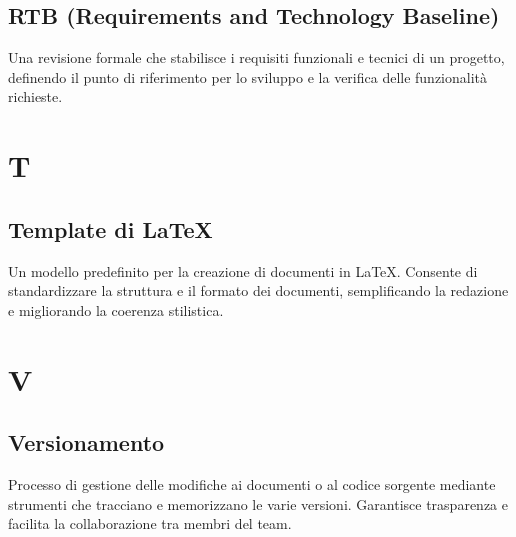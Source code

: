 \documentclass{article}
\begin{document}
\subsection{RTB (Requirements and Technology Baseline)}
Una revisione formale che stabilisce i requisiti funzionali e tecnici di un progetto, definendo il punto di riferimento per lo sviluppo e la verifica delle funzionalità richieste.

\newpage

\section{T}

\subsection{Template di LaTeX}
Un modello predefinito per la creazione di documenti in LaTeX. Consente di standardizzare la struttura e il formato dei documenti, semplificando la redazione e migliorando la coerenza stilistica.

\newpage

\section{V}

\subsection{Versionamento}
Processo di gestione delle modifiche ai documenti o al codice sorgente mediante strumenti che tracciano e memorizzano le varie versioni. Garantisce trasparenza e facilita la collaborazione tra membri del team.
\end{document}
